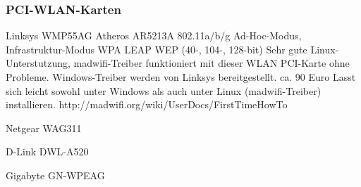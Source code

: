 \subsubsection{PCI-WLAN-Karten}

\begin{wlandevice}{Linksys WMP55AG}
\wlanchipset
Atheros AR5213A
\wlanieeestandard
802.11a/b/g
\wlanmode
Ad-Hoc-Modus, Infrastruktur-Modus
\wlansecurity
WPA
LEAP
WEP (40-, 104-, 128-bit)
\wlandriver
Sehr gute Linux-Unterstutzung, madwifi-Treiber funktioniert
mit dieser WLAN PCI-Karte ohne Probleme.
Windows-Treiber werden von Linksys bereitgestellt.
\wlanprice
ca. 90 Euro
\wlaninstall
Lasst sich leicht sowohl unter Windows als auch unter Linux (madwifi-Treiber) installieren.
http://madwifi.org/wiki/UserDocs/FirstTimeHowTo
\end{wlandevice}

\begin{wlandevice}{Netgear WAG311}
\wlanchipset
\wlanieeestandard
\wlanmode
\wlansecurity
\wlandriver
\wlanprice
\wlaninstall
\end{wlandevice}

\begin{wlandevice}{D-Link DWL-A520}
\wlanchipset
\wlanieeestandard
\wlanmode
\wlansecurity
\wlandriver
\wlanprice
\wlaninstall
\end{wlandevice}

\begin{wlandevice}{Gigabyte GN-WPEAG}
\wlanchipset
\wlanieeestandard
\wlanmode
\wlansecurity
\wlandriver
\wlanprice
\wlaninstall
\end{wlandevice}
